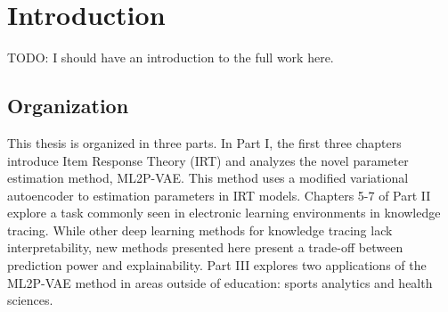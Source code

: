 \chapter{Introduction}
TODO: I should have an introduction to the full work here.

\section{Organization}
This thesis is organized in three parts. In Part I, the first three chapters introduce Item Response Theory (IRT) and analyzes the novel parameter estimation method, ML2P-VAE. This method uses a modified variational autoencoder to estimation parameters in IRT models. Chapters 5-7 of Part II explore a task commonly seen in electronic learning environments in knowledge tracing. While other deep learning methods for knowledge tracing lack interpretability, new methods presented here present a trade-off between prediction power and explainability. Part III explores two applications of the ML2P-VAE method in areas outside of education: sports analytics and health sciences.


